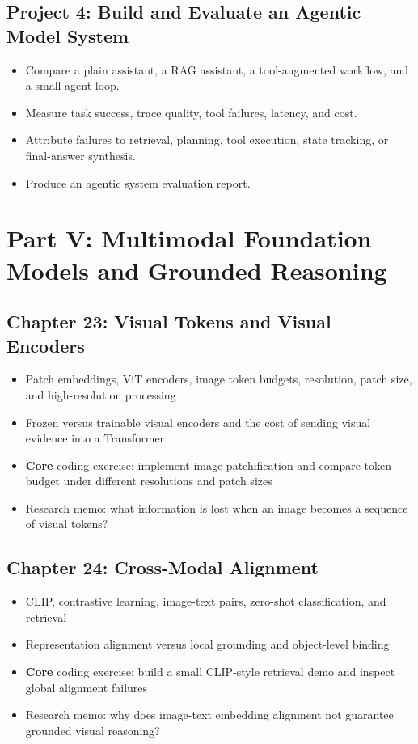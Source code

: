 \documentclass[11pt]{article}
\begin{document}
\subsection{Project 4: Build and Evaluate an Agentic Model System}

\begin{itemize}
    \item Compare a plain assistant, a RAG assistant, a tool-augmented workflow, and a small agent loop.
    \item Measure task success, trace quality, tool failures, latency, and cost.
    \item Attribute failures to retrieval, planning, tool execution, state tracking, or final-answer synthesis.
    \item Produce an agentic system evaluation report.
\end{itemize}

\section{Part V: Multimodal Foundation Models and Grounded Reasoning}

\subsection{Chapter 23: Visual Tokens and Visual Encoders}

\begin{itemize}
    \item Patch embeddings, ViT encoders, image token budgets, resolution, patch size, and high-resolution processing
    \item Frozen versus trainable visual encoders and the cost of sending visual evidence into a Transformer
    \item \textbf{Core} coding exercise: implement image patchification and compare token budget under different resolutions and patch sizes
    \item Research memo: what information is lost when an image becomes a sequence of visual tokens?
\end{itemize}

\subsection{Chapter 24: Cross-Modal Alignment}

\begin{itemize}
    \item CLIP, contrastive learning, image-text pairs, zero-shot classification, and retrieval
    \item Representation alignment versus local grounding and object-level binding
    \item \textbf{Core} coding exercise: build a small CLIP-style retrieval demo and inspect global alignment failures
    \item Research memo: why does image-text embedding alignment not guarantee grounded visual reasoning?
\end{itemize}
\end{document}
